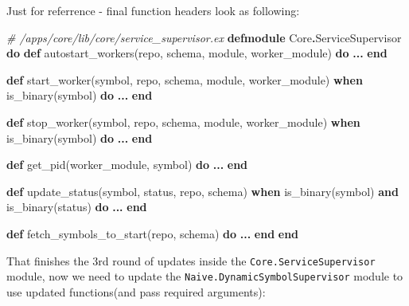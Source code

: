 \documentclass[
  oneside]{book}
\newenvironment{Shaded}{\begin{snugshade}}{\end{snugshade}}
\newcommand{\CommentTok}[1]{\textcolor[rgb]{0.56,0.35,0.01}{\textit{#1}}}
\newcommand{\ConstantTok}[1]{\textcolor[rgb]{0.00,0.00,0.00}{#1}}
\newcommand{\KeywordTok}[1]{\textcolor[rgb]{0.13,0.29,0.53}{\textbf{#1}}}
\newcommand{\NormalTok}[1]{#1}
\newcommand{\OperatorTok}[1]{\textcolor[rgb]{0.81,0.36,0.00}{\textbf{#1}}}
\begin{document}
Just for referrence - final function headers look as following:

\begin{Shaded}
\begin{Highlighting}[]
  \CommentTok{\# /apps/core/lib/core/service\_supervisor.ex}
\KeywordTok{defmodule} \ConstantTok{Core}\OperatorTok{.}\ConstantTok{ServiceSupervisor} \KeywordTok{do}
  \KeywordTok{def}\NormalTok{ autostart\_workers(repo, schema, module, worker\_module) }\KeywordTok{do}
    \OperatorTok{...}
  \KeywordTok{end}

  \KeywordTok{def}\NormalTok{ start\_worker(symbol, repo, schema, module, worker\_module)}
      \KeywordTok{when}\NormalTok{ is\_binary(symbol) }\KeywordTok{do}
    \OperatorTok{...}
  \KeywordTok{end}

  \KeywordTok{def}\NormalTok{ stop\_worker(symbol, repo, schema, module, worker\_module)}
      \KeywordTok{when}\NormalTok{ is\_binary(symbol) }\KeywordTok{do}
    \OperatorTok{...}
  \KeywordTok{end}

  \KeywordTok{def}\NormalTok{ get\_pid(worker\_module, symbol) }\KeywordTok{do}
    \OperatorTok{...}
  \KeywordTok{end}

  \KeywordTok{def}\NormalTok{ update\_status(symbol, status, repo, schema)}
      \KeywordTok{when}\NormalTok{ is\_binary(symbol) }\KeywordTok{and}\NormalTok{ is\_binary(status) }\KeywordTok{do}
    \OperatorTok{...}
  \KeywordTok{end}

  \KeywordTok{def}\NormalTok{ fetch\_symbols\_to\_start(repo, schema) }\KeywordTok{do}
    \OperatorTok{...}
  \KeywordTok{end}
\KeywordTok{end}
\end{Highlighting}
\end{Shaded}

That finishes the 3rd round of updates inside the \texttt{Core.ServiceSupervisor} module, now we need to update the \texttt{Naive.DynamicSymbolSupervisor} module to use updated functions(and pass required arguments):
\end{document}
